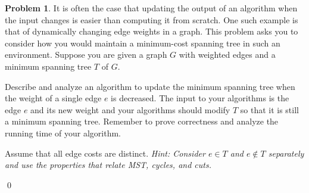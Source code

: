 \documentclass[11pt]{article}
\theoremstyle{definition}
\newtheorem{question}{Problem}
\newenvironment{solution}{\bigskip\noindent{\it Solution.}  \ignorespaces}{\hfill\qed}
\begin{document}
\newpage

\begin{question} 
It is often the case that updating the output of an algorithm when the input changes is easier than computing it from scratch.
One such example is that of dynamically changing edge weights in a graph.  This problem asks you to consider how you would maintain a minimum-cost spanning tree in
such an environment.  Suppose you are given a graph $G$ with weighted edges and a minimum spanning tree $T$ of $G$. 
		

	Describe and analyze an algorithm to update the minimum spanning tree when the weight of a single edge $e$ is decreased.
	 The input to your algorithms is the edge $e$ and its new weight and your algorithms should modify $T$ so that it is still a minimum spanning tree.  Remember to prove correctness and analyze the running time of your algorithm.
 
Assume that all edge costs are distinct. 
 {\em Hint:  Consider $e \in T$ and $e \not\in T$ separately and use the properties that relate MST, cycles, and cuts.}
\end{question}


\begin{solution}
\end{solution}

\newpage
\end{document}
